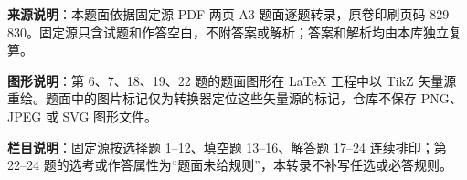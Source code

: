 


\begin{gktip}
\textbf{来源说明}：本题面依据固定源 PDF 两页 A3 题面逐题转录，原卷印刷页码 829–830。固定源只含试题和作答空白，不附答案或解析；答案和解析均由本库独立复算。

\textbf{图形说明}：第 6、7、18、19、22 题的题面图形在 LaTeX 工程中以 TikZ 矢量源重绘。题面中的图片标记仅为转换器定位这些矢量源的标记，仓库不保存 PNG、JPEG 或 SVG 图形文件。

\textbf{栏目说明}：固定源按选择题 1–12、填空题 13–16、解答题 17–24 连续排印；第 22–24 题的选考或作答属性为“题面未给规则”，本转录不补写任选或必答规则。
\end{gktip}


